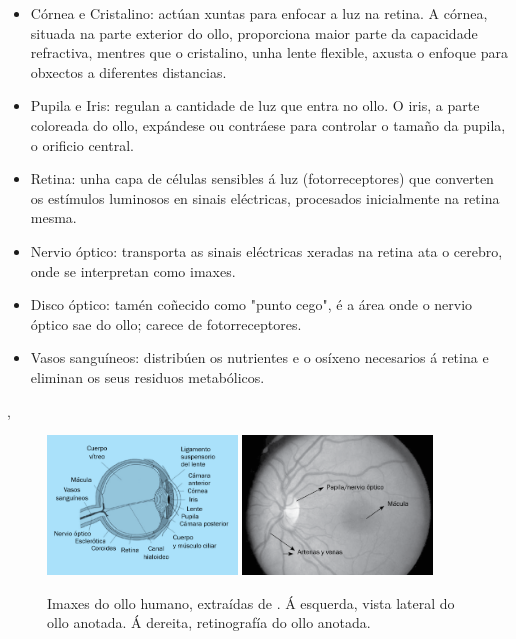  \begin{itemize}
 \item Córnea e Cristalino: actúan xuntas para enfocar a luz na retina. A córnea, situada na parte exterior do ollo, proporciona maior parte da capacidade refractiva, mentres que o cristalino, unha lente flexible, axusta o enfoque para obxectos a diferentes distancias.
 \item Pupila e Iris: regulan a cantidade de luz que entra no ollo. O iris, a parte coloreada do ollo, expándese ou contráese para controlar o tamaño da pupila, o orificio central.
 \item Retina: unha capa de células sensibles á luz (fotorreceptores) que converten os estímulos luminosos en sinais eléctricas, procesados inicialmente na retina mesma.
 \item Nervio óptico: transporta as sinais eléctricas xeradas na retina ata o cerebro, onde se interpretan como imaxes.
 \item Disco óptico: tamén coñecido como "punto cego", é a área onde o nervio óptico sae do ollo; carece de fotorreceptores.
 \item Vasos sanguíneos: distribúen os nutrientes e o osíxeno necesarios á retina e eliminan os seus residuos metabólicos.
 \end{itemize}
\cite{visionyojo}, \cite{eyeanat}

\begin{figure}[ht!]
    \centering
    \includegraphics[width=0.45\textwidth]{imaxes/ojo1.png}
    \includegraphics[width=0.45\textwidth]{imaxes/ojo2.png}
    \caption{Imaxes do ollo humano, extraídas de \cite{visionyojo}. Á esquerda, vista lateral do ollo anotada. Á dereita, retinografía do ollo anotada.}
    \label{fig:imaxes_ojo}
\end{figure}

